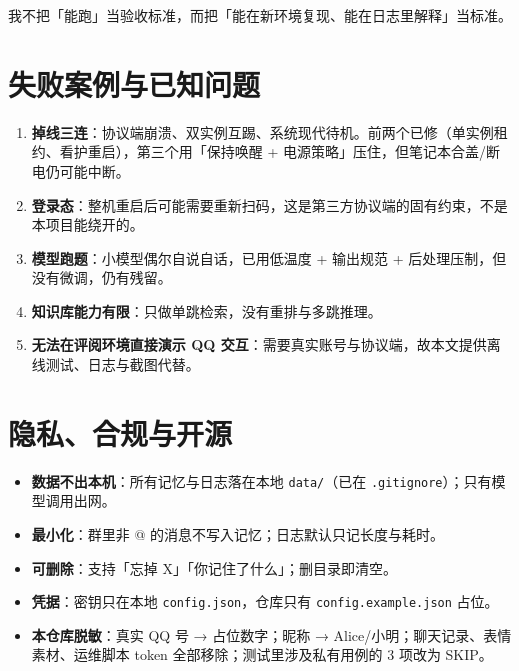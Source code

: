 \documentclass[11pt,a4paper]{ctexart}
\begin{document}
我不把「能跑」当验收标准，而把「能在新环境复现、能在日志里解释」当标准。

\section{失败案例与已知问题}

\begin{enumerate}[leftmargin=1.6em]
\item \textbf{掉线三连}：协议端崩溃、双实例互踢、系统现代待机。前两个已修（单实例租约、看护重启），第三个用「保持唤醒 + 电源策略」压住，但笔记本合盖/断电仍可能中断。
\item \textbf{登录态}：整机重启后可能需要重新扫码，这是第三方协议端的固有约束，不是本项目能绕开的。
\item \textbf{模型跑题}：小模型偶尔自说自话，已用低温度 + 输出规范 + 后处理压制，但没有微调，仍有残留。
\item \textbf{知识库能力有限}：只做单跳检索，没有重排与多跳推理。
\item \textbf{无法在评阅环境直接演示 QQ 交互}：需要真实账号与协议端，故本文提供离线测试、日志与截图代替。
\end{enumerate}

\section{隐私、合规与开源}

\begin{itemize}[leftmargin=1.6em]
\item \textbf{数据不出本机}：所有记忆与日志落在本地 \texttt{data/}（已在 \texttt{.gitignore}）；只有模型调用出网。
\item \textbf{最小化}：群里非 @ 的消息不写入记忆；日志默认只记长度与耗时。
\item \textbf{可删除}：支持「忘掉 X」「你记住了什么」；删目录即清空。
\item \textbf{凭据}：密钥只在本地 \texttt{config.json}，仓库只有 \texttt{config.example.json} 占位。
\item \textbf{本仓库脱敏}：真实 QQ 号 → 占位数字；昵称 → Alice/小明；聊天记录、表情素材、运维脚本 token 全部移除；测试里涉及私有用例的 3 项改为 SKIP。
\end{itemize}
\end{document}
